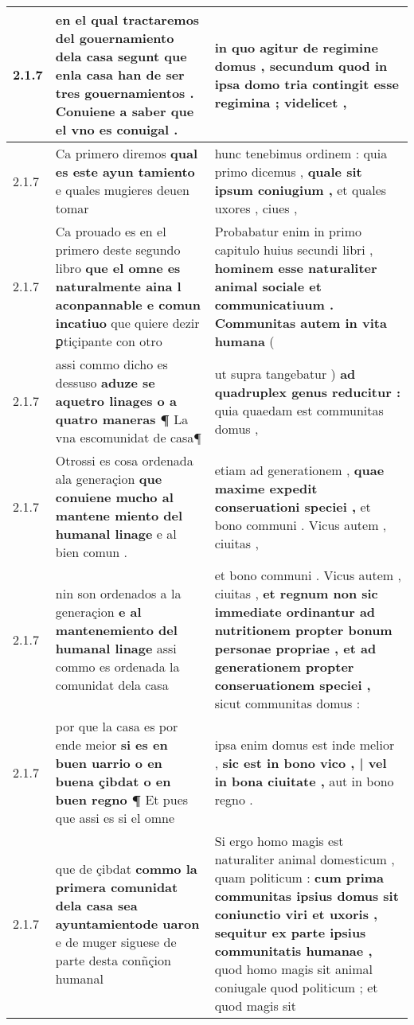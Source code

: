\begin{tabular}{|p{1cm}|p{6.5cm}|p{6.5cm}|}
2.1.7 & en el qual tractaremos del gouernamiento dela casa \textbf{ segunt que enla casa han de ser tres gouernamientos . } Conuiene a saber que el vno es conuigal . & in quo agitur de regimine domus , \textbf{ secundum quod in ipsa domo tria contingit esse regimina ; } videlicet , \\\hline
2.1.7 & Ca primero diremos \textbf{ qual es este ayun tamiento } e quales mugieres deuen tomar & hunc tenebimus ordinem : quia primo dicemus , \textbf{ quale sit ipsum coniugium , } et quales uxores , ciues , \\\hline
2.1.7 & Ca prouado es en el primero deste segundo libro \textbf{ que el omne es naturalmente aina l aconpannable e comun incatiuo } que quiere dezir ꝑtiçipante con otro & Probabatur enim in primo capitulo huius secundi libri , \textbf{ hominem esse naturaliter animal sociale et communicatiuum . Communitas autem in vita humana } ( \\\hline
2.1.7 & assi commo dicho es dessuso \textbf{ aduze se aquetro linages o a quatro maneras ¶ } La vna escomunidat de casa¶ & ut supra tangebatur ) \textbf{ ad quadruplex genus reducitur : } quia quaedam est communitas domus , \\\hline
2.1.7 & Otrossi es cosa ordenada ala generaçion \textbf{ que conuiene mucho al mantene miento del humanal linage } e al bien comun . & etiam ad generationem , \textbf{ quae maxime expedit conseruationi speciei , } et bono communi . Vicus autem , ciuitas , \\\hline
2.1.7 & nin son ordenados a la generaçion \textbf{ e al mantenemiento del humanal linage } assi commo es ordenada la comunidat dela casa & et bono communi . Vicus autem , ciuitas , \textbf{ et regnum non sic immediate ordinantur ad nutritionem propter bonum personae propriae , et ad generationem propter conseruationem speciei , } sicut communitas domus : \\\hline
2.1.7 & por que la casa es por ende meior \textbf{ si es en buen uarrio o en buena çibdat o en buen regno ¶ } Et pues que assi es si el omne & ipsa enim domus est inde melior , \textbf{ sic est in bono vico , | vel in bona ciuitate , } aut in bono regno . \\\hline
2.1.7 & que de çibdat \textbf{ commo la primera comunidat dela casa sea ayuntamientode uaron } e de muger siguese de parte desta conñçion humanal & Si ergo homo magis est naturaliter animal domesticum , quam politicum : \textbf{ cum prima communitas ipsius domus sit coniunctio viri et uxoris , sequitur ex parte ipsius communitatis humanae , } quod homo magis sit animal coniugale quod politicum ; et quod magis sit \\\hline

\end{tabular}
